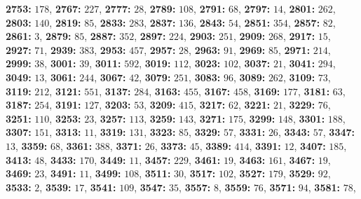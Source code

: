 \textsf{\bfseries 2753:} $178$, \textsf{\bfseries 2767:} $227$, \textsf{\bfseries 2777:} $28$, \textsf{\bfseries 2789:} $108$, \textsf{\bfseries 2791:} $68$, \textsf{\bfseries 2797:} $14$, \textsf{\bfseries 2801:} $262$, \textsf{\bfseries 2803:} $140$, \textsf{\bfseries 2819:} $85$, \textsf{\bfseries 2833:} $283$, \textsf{\bfseries 2837:} $136$, \textsf{\bfseries 2843:} $54$, \textsf{\bfseries 2851:} $354$, \textsf{\bfseries 2857:} $82$, \textsf{\bfseries 2861:} $3$, \textsf{\bfseries 2879:} $85$, \textsf{\bfseries 2887:} $352$, \textsf{\bfseries 2897:} $224$, \textsf{\bfseries 2903:} $251$, \textsf{\bfseries 2909:} $268$, \textsf{\bfseries 2917:} $15$, \textsf{\bfseries 2927:} $71$, \textsf{\bfseries 2939:} $383$, \textsf{\bfseries 2953:} $457$, \textsf{\bfseries 2957:} $28$, \textsf{\bfseries 2963:} $91$, \textsf{\bfseries 2969:} $85$, \textsf{\bfseries 2971:} $214$, \textsf{\bfseries 2999:} $38$, \textsf{\bfseries 3001:} $39$, \textsf{\bfseries 3011:} $592$, \textsf{\bfseries 3019:} $112$, \textsf{\bfseries 3023:} $102$, \textsf{\bfseries 3037:} $21$, \textsf{\bfseries 3041:} $294$, \textsf{\bfseries 3049:} $13$, \textsf{\bfseries 3061:} $244$, \textsf{\bfseries 3067:} $42$, \textsf{\bfseries 3079:} $251$, \textsf{\bfseries 3083:} $96$, \textsf{\bfseries 3089:} $262$, \textsf{\bfseries 3109:} $73$, \textsf{\bfseries 3119:} $212$, \textsf{\bfseries 3121:} $551$, \textsf{\bfseries 3137:} $284$, \textsf{\bfseries 3163:} $455$, \textsf{\bfseries 3167:} $458$, \textsf{\bfseries 3169:} $177$, \textsf{\bfseries 3181:} $63$, \textsf{\bfseries 3187:} $254$, \textsf{\bfseries 3191:} $127$, \textsf{\bfseries 3203:} $53$, \textsf{\bfseries 3209:} $415$, \textsf{\bfseries 3217:} $62$, \textsf{\bfseries 3221:} $21$, \textsf{\bfseries 3229:} $76$, \textsf{\bfseries 3251:} $110$, \textsf{\bfseries 3253:} $23$, \textsf{\bfseries 3257:} $113$, \textsf{\bfseries 3259:} $143$, \textsf{\bfseries 3271:} $175$, \textsf{\bfseries 3299:} $148$, \textsf{\bfseries 3301:} $188$, \textsf{\bfseries 3307:} $151$, \textsf{\bfseries 3313:} $11$, \textsf{\bfseries 3319:} $131$, \textsf{\bfseries 3323:} $85$, \textsf{\bfseries 3329:} $57$, \textsf{\bfseries 3331:} $26$, \textsf{\bfseries 3343:} $57$, \textsf{\bfseries 3347:} $13$, \textsf{\bfseries 3359:} $68$, \textsf{\bfseries 3361:} $388$, \textsf{\bfseries 3371:} $26$, \textsf{\bfseries 3373:} $45$, \textsf{\bfseries 3389:} $414$, \textsf{\bfseries 3391:} $12$, \textsf{\bfseries 3407:} $185$, \textsf{\bfseries 3413:} $48$, \textsf{\bfseries 3433:} $170$, \textsf{\bfseries 3449:} $11$, \textsf{\bfseries 3457:} $229$, \textsf{\bfseries 3461:} $19$, \textsf{\bfseries 3463:} $161$, \textsf{\bfseries 3467:} $19$, \textsf{\bfseries 3469:} $23$, \textsf{\bfseries 3491:} $11$, \textsf{\bfseries 3499:} $108$, \textsf{\bfseries 3511:} $30$, \textsf{\bfseries 3517:} $102$, \textsf{\bfseries 3527:} $179$, \textsf{\bfseries 3529:} $92$, \textsf{\bfseries 3533:} $2$, \textsf{\bfseries 3539:} $17$, \textsf{\bfseries 3541:} $109$, \textsf{\bfseries 3547:} $35$, \textsf{\bfseries 3557:} $8$, \textsf{\bfseries 3559:} $76$, \textsf{\bfseries 3571:} $94$, \textsf{\bfseries 3581:} $78$, 
